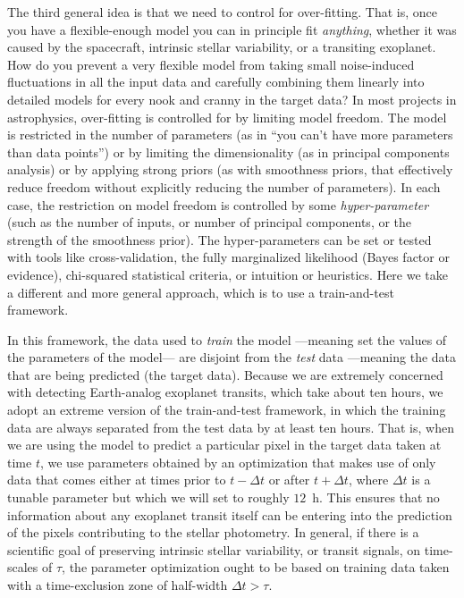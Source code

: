 \documentclass[12pt, preprint]{aastex}
\begin{document}
The third general idea is that we need to control for over-fitting.
That is, once you have a flexible-enough model you can in principle fit \emph{anything},
  whether it was caused by the spacecraft, intrinsic stellar variability, or a transiting exoplanet.
How do you prevent a very flexible model from taking small noise-induced fluctuations in all the input data
  and carefully combining them linearly into detailed models for every nook and cranny in the target data?
In most projects in astrophysics, over-fitting is controlled for by limiting model freedom.
The model is restricted in the number of parameters
  (as in ``you can't have more parameters than data points'')
  or by limiting the dimensionality
  (as in principal components analysis)
  or by applying strong priors
  (as with smoothness priors, that effectively reduce freedom without explicitly reducing the number of parameters).
In each case, the restriction on model freedom is controlled by some \emph{hyper-parameter}
  (such as the number of inputs, or number of principal components, or the strength of the smoothness prior).
The hyper-parameters can be set or tested with tools like cross-validation,
  the fully marginalized likelihood (Bayes factor or evidence),
  chi-squared statistical criteria,
  or intuition or heuristics.
Here we take a different and more general approach, which is to use a train-and-test framework.

In this framework, the data used to \emph{train} the model%
  ---meaning set the values of the parameters of the model---%
  are disjoint from the \emph{test} data
  ---meaning the data that are being predicted (the target data).
Because we are extremely concerned with detecting Earth-analog exoplanet transits,
  which take about ten hours,
  we adopt an extreme version of the train-and-test framework,
  in which the training data are always separated from the test data by at least ten hours.
That is, when we are using the model to predict a particular pixel in the target data taken at time $t$,
  we use parameters obtained by an optimization that makes use of only data
  that comes either at times prior to $t-\Delta t$ or after $t+\Delta t$,
  where $\Delta t$ is a tunable parameter but which we will set to roughly $12$~h.
This ensures that no information about any exoplanet transit itself
  can be entering into the prediction of the pixels contributing to the stellar photometry.
In general, if there is a scientific goal of preserving intrinsic stellar variability,
  or transit signals,
  on time-scales of $\tau$,
  the parameter optimization ought to be based on training data taken with a time-exclusion zone of half-width $\Delta t > \tau$.
\end{document}
